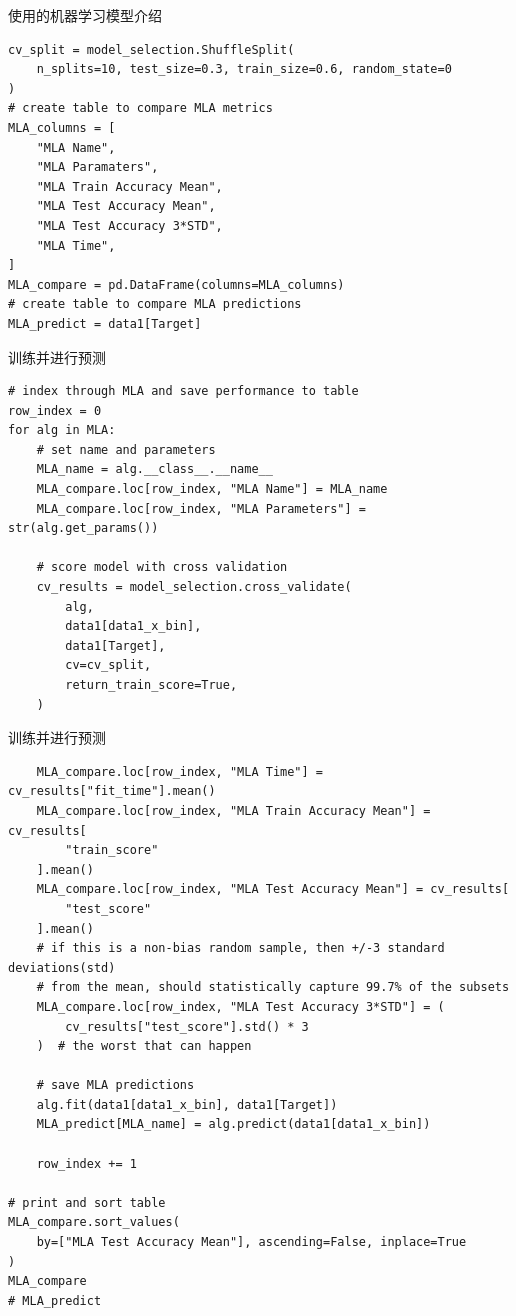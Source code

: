 \documentclass{beamer}
\begin{document}
\begin{frame}[fragile]{使用的机器学习模型介绍}
	\begin{verbatim}
cv_split = model_selection.ShuffleSplit(
    n_splits=10, test_size=0.3, train_size=0.6, random_state=0
)
# create table to compare MLA metrics
MLA_columns = [
    "MLA Name",
    "MLA Paramaters",
    "MLA Train Accuracy Mean",
    "MLA Test Accuracy Mean",
    "MLA Test Accuracy 3*STD",
    "MLA Time",
]
MLA_compare = pd.DataFrame(columns=MLA_columns)
# create table to compare MLA predictions
MLA_predict = data1[Target]
	\end{verbatim}
\end{frame}

\begin{frame}[fragile]{训练并进行预测}
	\begin{verbatim}
# index through MLA and save performance to table
row_index = 0
for alg in MLA:
    # set name and parameters
    MLA_name = alg.__class__.__name__
    MLA_compare.loc[row_index, "MLA Name"] = MLA_name
    MLA_compare.loc[row_index, "MLA Parameters"] = str(alg.get_params())

    # score model with cross validation
    cv_results = model_selection.cross_validate(
        alg,
        data1[data1_x_bin],
        data1[Target],
        cv=cv_split,
        return_train_score=True,
    )
	\end{verbatim}
\end{frame}

\begin{frame}[fragile]{训练并进行预测}
	\begin{verbatim}
    MLA_compare.loc[row_index, "MLA Time"] = cv_results["fit_time"].mean()
    MLA_compare.loc[row_index, "MLA Train Accuracy Mean"] = cv_results[
        "train_score"
    ].mean()
    MLA_compare.loc[row_index, "MLA Test Accuracy Mean"] = cv_results[
        "test_score"
    ].mean()
    # if this is a non-bias random sample, then +/-3 standard deviations(std)
    # from the mean, should statistically capture 99.7% of the subsets
    MLA_compare.loc[row_index, "MLA Test Accuracy 3*STD"] = (
        cv_results["test_score"].std() * 3
    )  # the worst that can happen

    # save MLA predictions
    alg.fit(data1[data1_x_bin], data1[Target])
    MLA_predict[MLA_name] = alg.predict(data1[data1_x_bin])

    row_index += 1

# print and sort table
MLA_compare.sort_values(
    by=["MLA Test Accuracy Mean"], ascending=False, inplace=True
)
MLA_compare
# MLA_predict
		\end{verbatim}
\end{frame}
\end{document}
